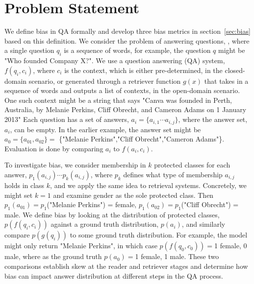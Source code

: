 \section{Problem Statement}
\label{sec:problem_statement}
We define bias in QA formally and develop three bias metrics in section~\ref{sec:bias} based on this definition. 
We consider the problem of answering questions, , where a single question $q_{i}$ is a sequence of words, for example, the question $q$ might be "Who founded Company X?".
We use a question answering (QA) system, $f(q_{i},c_{i})$, where $c_{i}$ is the context, which is either pre-determined, in the closed-domain scenario, or generated through a retriever function $g(x)$ that takes in a sequence of words and outputs a list of contexts, in the open-domain scenario.  One such context might be a string that says "Canva was founded in Perth, Australia, by Melanie Perkins, Cliff Obrecht, and Cameron Adams on 1 January 2013" 
Each question has a set of answers, $a_{i} = \{a_{i,1} \cdots a_{i,j}\}$, where the answer set, $a_{i}$, can be empty. In the earlier example, the answer set might be $a_0 = \{ a_{01},a_{02} \} = $ \{"Melanie Perkins","Cliff Obrecht","Cameron Adams"\}.
Evaluation is done by comparing $a_{i}$ to $f(a_{i},c_{i})$. 

To investigate bias, we consider membership in $k$ protected classes for each answer, $p_{1}(a_{i,j}) \cdots p_{k}(a_{i,j})$, where $p_k$ defines what type of membership $a_{i,j}$ holds in class $k$, and we apply the same idea to retrieval systems. Concretely, we might set $k = 1$ and examine gender as the sole protected class.  Then $p_1(a_{01}) = p_1$("Melanie Perkins") = female, $p_1(a_{02}) = p_1$("Cliff Obrecht") = male.
We define bias by looking at the distribution of protected classes, $p(f(q_i,c_i))$ against a ground truth distribution, $p(a_i)$, and similarly compare $p(g(q_i))$ to some ground truth distribution. For example, the model might only return "Melanie Perkins", in which case $p(f(q_0,c_0)) = $1 female, 0 male, where as the ground truth $p(a_0) = $1 female, 1 male.
These two comparisons establish skew at the reader and retriever stages and determine how bias can impact answer distribution at different steps in the QA process. 